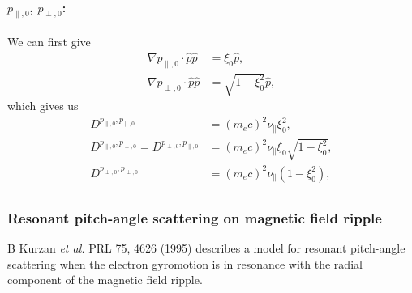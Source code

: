 \documentclass[11pt,a4paper]{article}
\begin{document}
\paragraph{$p_{\parallel,0}$, $p_{\perp,0}$:}
We can first give
\begin{align}
\nabla p_{\parallel,0} \cdot \hat{p}\hat{p} &= \xi_0 \hat{p} , \nonumber \\
\nabla p_{\perp,0} \cdot \hat{p}\hat{p} &= \sqrt{1-\xi_0^2}\hat{p},
\end{align}
which gives us
\begin{align}
D^{p_{\parallel,0},p_{\parallel,0}} &= (m_e c)^2 \nu_\parallel \xi_0^2, \nonumber \\
D^{p_{\parallel,0},p_{\perp,0}} = D^{p_{\perp,0},p_{\parallel,0}} &= (m_e c)^2 \nu_\parallel \xi_0\sqrt{1-\xi_0^2}, \nonumber \\
D^{p_{\perp,0},p_{\perp,0}} &= (m_e c)^2 \nu_\parallel(1- \xi_0^2), \nonumber \\
\end{align}


\subsubsection*{Resonant pitch-angle scattering on magnetic field ripple}
B Kurzan \emph{et al.} PRL 75, 4626 (1995) describes a model for resonant pitch-angle scattering when the electron gyromotion is in resonance with the radial component of the magnetic field ripple. 
\end{document}
